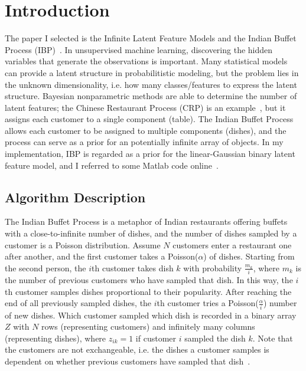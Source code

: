  \section{Introduction}
 \label{sec:intro}
 
The paper I selected is the Infinite Latent Feature Models and the Indian Buffet Process (IBP)~\cite{griffiths2005infinite}. In unsupervised machine learning, discovering the hidden variables that generate the observations is important. Many statistical models~\cite{blei2003latent, gershman2012tutorial} can provide a latent structure in probabilitistic modeling, but the problem lies in the unknown dimensionality, i.e. how many classes/features to express the latent structure. Bayesian nonparametric methods are able to determine the number of latent features; the Chinese Restaurant Process (CRP) is an example~\cite{crp2004hierarchical}, but it assigns each customer to a single component (table). The Indian Buffet Process allows each customer to be assigned to multiple components (dishes), and the process can serve as a prior for an potentially infinite array of objects. In my implementation, IBP is regarded as a prior for the linear-Gaussian binary latent feature model, and I referred to some Matlab code online~\cite{ibp2012matlab, ibp2012code}.

\subsection{Algorithm Description}
The Indian Buffet Process is a metaphor of Indian restaurants offering buffets with a close-to-infinite number of dishes, and the number of dishes sampled by a customer is a Poisson distribution. Assume $N$ customers enter a restaurant one after another, and the first customer takes a Poisson($\alpha$) of dishes. Starting from the second person, the $i$th customer takes dish $k$ with probability $\frac{m_k}{i}$, where $m_k$ is the number of previous customers who have sampled that dish. In this way, the $i$th customer samples dishes proportional to their popularity. After reaching the end of all previously sampled dishes, the $i$th customer tries a Poisson($\frac{\alpha}{i}$) number of new dishes. Which customer sampled which dish is recorded in a binary array $Z$ with $N$ rows (representing customers) and infinitely many columns (representing dishes), where $z_{ik} = 1$ if customer $i$ sampled the dish $k$. Note that the customers are not exchangeable, i.e. the dishes a customer samples is dependent on whether previous customers have sampled that dish~\cite{griffiths2005infinite}.\\

